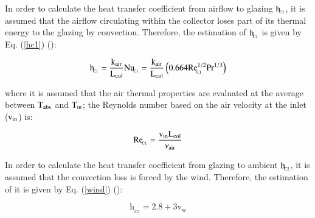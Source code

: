 

In order to calculate the heat transfer coefficient from airflow to glazing $\rm{h_{\!_{C1}}}$, it is assumed that the airflow circulating within the collector loses part of its thermal energy to the glazing by convection. Therefore, the estimation of $\rm{h_{\!_{C1}}}$ is given by Eq. (\ref{hc1}) (\cite{Zheng2016}):

\vspace{-0.75cm}
\begin{equation}
\mathrm{{h_{\!_{C1}}} = \frac{k_{air}}{L_{col}}{Nu_{\!_{C1}}} = \frac{{{k_{air}}}}{{{L_{col}}}}\left( {0.664{\rm{Re}}_{\!_{C1}}^{1/2}{\rm{Pr}}^{1/3}} \right)}
\label{hc1}
\end{equation}

\noindent where it is assumed that the air thermal properties are evaluated at the average between $\rm{T_{abs}}$ and $\rm{T_{in}}$; the Reynolds number based on the air velocity at the inlet ($\rm{v_{in}}$) is:

\vspace{-0.75cm}
\begin{equation}
\mathrm{{{\mathop{\rm Re}\nolimits}_{\!_{C1}}} = \frac{{{v_{in}}{L_{col}}}}{{{\mathlarger{\nu}_{air}}}}}
\label{Rec1}
\end{equation}

In order to calculate the heat transfer coefficient from glazing to ambient $\rm{h_{\!_{C2}}}$, it is assumed that the convection loss is forced by the wind. Therefore, the estimation of it is given by Eq. (\ref{wind}) (\cite{Tchinda2008}):

\vspace{-0.75cm}
\begin{equation}
	\mathrm{h_{\!_{C2}} = 2.8 + 3v_w}
	\label{wind}
\end{equation}

